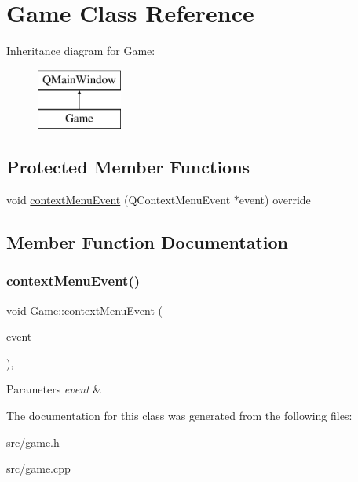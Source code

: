 \hypertarget{class_game}{}\section{Game Class Reference}
\label{class_game}
Inheritance diagram for Game\+:\begin{figure}[H]
\begin{center}
\leavevmode
\includegraphics[height=2.000000cm]{class_game}
\end{center}
\end{figure}
\subsection*{Protected Member Functions}
\begin{DoxyCompactItemize}
\item 
void \mbox{\hyperlink{class_game_a4122fd61c61ca57ecbe4458f938e2f98}{context\+Menu\+Event}} (Q\+Context\+Menu\+Event $\ast$event) override
\end{DoxyCompactItemize}


\subsection{Member Function Documentation}
\mbox{\label{class_game_a4122fd61c61ca57ecbe4458f938e2f98}} 
\subsubsection{\texorpdfstring{contextMenuEvent()}{contextMenuEvent()}}
{\footnotesize\ttfamily void Game\+::context\+Menu\+Event (\begin{DoxyParamCaption}\item[{Q\+Context\+Menu\+Event $\ast$}]{event }\end{DoxyParamCaption})\hspace{0.3cm}{\ttfamily [override]}, {\ttfamily [protected]}}


\begin{DoxyParams}{Parameters}
{\em event} & \\
\hline
\end{DoxyParams}


The documentation for this class was generated from the following files\+:\begin{DoxyCompactItemize}
\item 
src/game.\+h\item 
src/game.\+cpp\end{DoxyCompactItemize}
